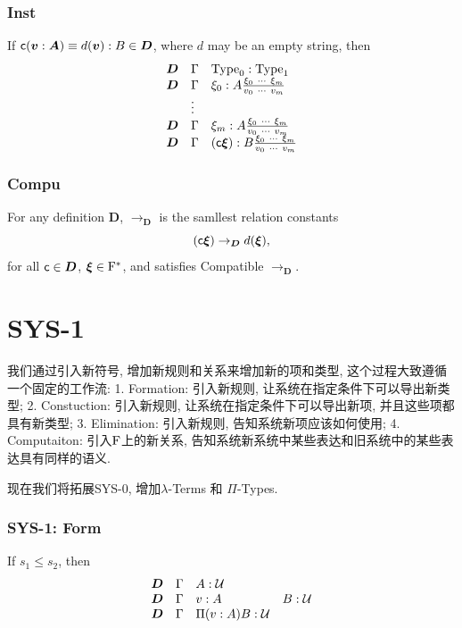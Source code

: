 \subsubsection*{Inst}
If $\text{{\sffamily c}} (\boldsymbol{v} : \boldsymbol{A}) \equiv d (\boldsymbol{v}) : B \in \boldsymbol{D}$, where $d$ may be an empty string, then 
\[
  \begin{array}{lll}
    \bm D & \Gamma & \Type_0 : \Type_1
    \\ 
    \bm D & \Gamma & \xi_0 : A \tfrac{\xi_0 \ \cdots \ \xi_m}{v_0 \ \cdots \ v_m}
    \\
          & \vdots &
    \\
    \bm D & \Gamma & \xi_m : A \tfrac{\xi_0 \ \cdots \ \xi_m}{v_0 \ \cdots \ v_m} 
    \\
    \bm D & \Gamma & (\cc c \bm{\xi}) : B \tfrac{\xi_0 \ \cdots \ \xi_m}{v_0 \ \cdots \ v_m} 
  \end{array}
\]




\subsubsection*{Compu}
\begin{definition}
  For any definition $\bm D$, $\rightarrow_{\bm D}$ is the samllest relation constants
  \[
    (\text{{\sffamily c}} \boldsymbol{\xi}) \rightarrow_{\boldsymbol{D}} d(\boldsymbol{\xi}),
  \]
  for all $\text{{\sffamily c}} \in \boldsymbol{D}$, $\boldsymbol{\xi} \in \mathrm{F}^*$, and satisfies Compatible $\rightarrow_{\bm D}$.
\end{definition}







\section{SYS-1}

我们通过引入新符号, 增加新规则和关系来增加新的项和类型, 这个过程大致遵循一个固定的工作流:
1. Formation: 引入新规则, 让系统在指定条件下可以导出新类型;
2. Constuction: 引入新规则, 让系统在指定条件下可以导出新项, 并且这些项都具有新类型;
3. Elimination: 引入新规则, 告知系统新项应该如何使用;
4. Computaiton: 引入$\mathrm{F}$上的新关系, 告知系统新系统中某些表达和旧系统中的某些表达具有同样的语义.


现在我们将拓展SYS-0, 增加$\lambda$-Terms 和 $\Pi$-Types. 


\subsubsection*{SYS-1: Form}
If $s_1 \leq s_2$, then
\[
  \begin{array}{llll}
    \boldsymbol{D} & \Gamma & A : \mathcal{U}  &
    \\ 
    \boldsymbol{D} & \Gamma & v : A    & B : \mathcal{U}
    \\
    \boldsymbol{D} & \Gamma & \Pi (v : A) B : \mathcal{U}
  \end{array}
\]



